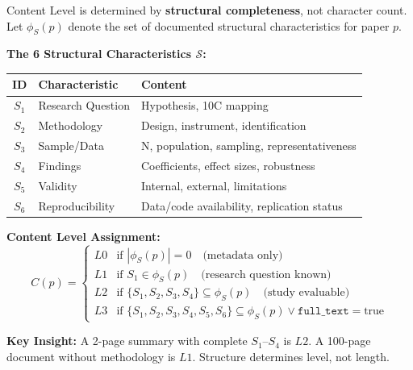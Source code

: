 \begin{tcolorbox}[colback=blue!5!white, colframe=blue!75!black,
    title=\textbf{Definition 2: Content Level Function $C: \mathcal{P} \to \{L0, L1, L2, L3\}$}]

Content Level is determined by \textbf{structural completeness}, not character count.
Let $\phi_S(p)$ denote the set of documented structural characteristics for paper $p$.

\textbf{The 6 Structural Characteristics $\mathcal{S}$:}
\begin{table}[H]
\centering
\begin{tabular}{@{}clp{6cm}@{}}
\toprule
\textbf{ID} & \textbf{Characteristic} & \textbf{Content} \\
\midrule
$S_1$ & Research Question & Hypothesis, 10C mapping \\
$S_2$ & Methodology & Design, instrument, identification \\
$S_3$ & Sample/Data & N, population, sampling, representativeness \\
$S_4$ & Findings & Coefficients, effect sizes, robustness \\
$S_5$ & Validity & Internal, external, limitations \\
$S_6$ & Reproducibility & Data/code availability, replication status \\
\bottomrule
\end{tabular}
\end{table}

\textbf{Content Level Assignment:}
\begin{equation}
C(p) =
\begin{cases}
L0 & \text{if } |\phi_S(p)| = 0 \quad \text{(metadata only)} \\
L1 & \text{if } S_1 \in \phi_S(p) \quad \text{(research question known)} \\
L2 & \text{if } \{S_1, S_2, S_3, S_4\} \subseteq \phi_S(p) \quad \text{(study evaluable)} \\
L3 & \text{if } \{S_1, S_2, S_3, S_4, S_5, S_6\} \subseteq \phi_S(p) \lor \texttt{full\_text} = \text{true}
\end{cases}
\end{equation}

\textbf{Key Insight:} A 2-page summary with complete $S_1$--$S_4$ is $L2$.
A 100-page document without methodology is $L1$. Structure determines level, not length.

\end{tcolorbox}

